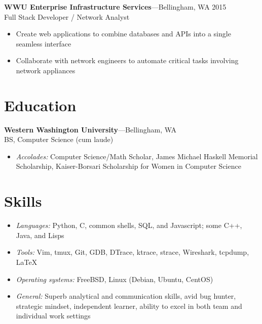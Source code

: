 \documentclass[11pt, letterpaper]{article}
\begin{document}
\bigskip

\textbf{WWU Enterprise Infrastructure Services}---Bellingham, WA \hfill 2015\\
Full Stack Developer / Network Analyst

\begin{itemize}
    \item Create web applications to combine databases and APIs into a single seamless interface
    \item Collaborate with network engineers to automate critical tasks involving network appliances
\end{itemize}

\section*{Education}

\textbf{Western Washington University}---Bellingham, WA\\
BS, Computer Science (cum laude)

\begin{itemize}
    \item \textit{Accolades:} Computer Science/Math Scholar, James Michael Haskell Memorial Scholarship, Kaiser-Borsari Scholarship for Women in Computer Science
\end{itemize}

\section*{Skills}
\setlength{\parskip}{11pt}

\raggedright
\begin{itemize}
    \item \textit{Languages:} Python, C, common shells, SQL, and Javascript; some C++, Java, and Lisps
    \item \textit{Tools:} Vim, tmux, Git, GDB, DTrace, ktrace, strace, Wireshark, tcpdump, \LaTeX
    \item \textit{Operating systems:} FreeBSD, Linux (Debian, Ubuntu, CentOS)
    \item \textit{General:} Superb analytical and communication skills, avid bug hunter, strategic mindset, independent learner, ability to excel in both team and individual work settings
\end{itemize}
\end{document}
